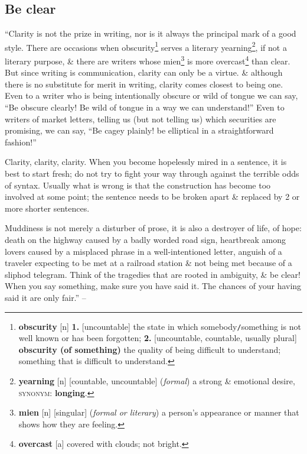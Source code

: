 \documentclass[oneside]{book}
\numberwithin{equation}{section}
\begin{document}
\subsection{Be clear}
``Clarity is not the prize in writing, nor is it always the principal mark of a good style. There are occasions when obscurity\footnote{\textbf{obscurity} [n] \textbf{1.} [uncountable] the state in which somebody\texttt{/}something is not well known or has been forgotten; \textbf{2.} [uncountable, countable, usually plural] \textbf{obscurity (of something)} the quality of being difficult to understand; something that is difficult to understand.} serves a literary yearning\footnote{\textbf{yearning} [n] [countable, uncountable] (\textit{formal}) a strong \& emotional desire, \textsc{synonym}: \textbf{longing}.}, if not a literary purpose, \& there are writers whose mien\footnote{\textbf{mien} [n] [singular] (\textit{formal or literary}) a person's appearance or manner that shows how they are feeling.} is more overcast\footnote{\textbf{overcast} [a] covered with clouds; not bright.} than clear. But since writing is communication, clarity can only be a virtue. \& although there is no substitute for merit in writing, clarity comes closest to being one. Even to a writer who is being intentionally obscure or wild of tongue we can say, ``Be obscure clearly! Be wild of tongue in a way we can understand!'' Even to writers of market letters, telling us (but not telling us) which securities are promising, we can say, ``Be cagey plainly! be elliptical in a straightforward fashion!''

Clarity, clarity, clarity. When you become hopelessly mired in a sentence, it is best to start fresh; do not try to fight your way through against the terrible odds of syntax. Usually what is wrong is that the construction has become too involved at some point; the sentence needs to be broken apart \& replaced by 2 or more shorter sentences.

Muddiness is not merely a disturber of prose, it is also a destroyer of life, of hope: death on the highway caused by a badly worded road sign, heartbreak among lovers caused by a misplaced phrase in a well-intentioned letter, anguish of a traveler expecting to be met at a railroad station \& not being met because of a sliphod telegram. Think of the tragedies that are rooted in ambiguity, \& be clear! When you say something, make sure you have said it. The chances of your having said it are only fair.'' -- \cite[Chap. 5, Sect. 16, p. 95]{Strunk_White2019}
\end{document}
